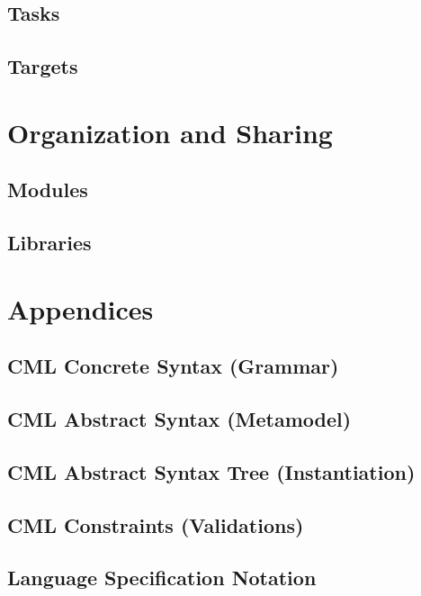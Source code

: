 \documentclass[a4paper,oneside,12pt, extrafontsizes]{memoir}
\theoremstyle{definition}
\theoremstyle{definition}
\theoremstyle{definition}
\theoremstyle{definition}
\begin{document}
\chapter{Tasks}
\label{sec:tasks}

\chapter{Targets}
\label{sec:targets}

\part{Organization and Sharing}

\chapter{Modules}
\label{ch:modules}

\chapter{Libraries}
\label{ch:libraries}

\part{Appendices}

\appendix

\chapter{CML Concrete Syntax (Grammar)}
\label{apx:concrete-syntax}


\chapter{CML Abstract Syntax (Metamodel)}
\label{apx:abstract-syntax}


\chapter{CML Abstract Syntax Tree (Instantiation)}
\label{apx:ast}


\chapter{CML Constraints (Validations)}
\label{apx:ocl}


\chapter{Language Specification Notation}
\label{apx:lsl}


\backmatter



\end{document}

